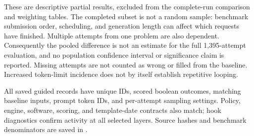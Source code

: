 These are descriptive partial results, excluded from the complete-run comparison and weighting tables. The completed subset is not a random sample: benchmark submission order, scheduling, and generation length can affect which requests have finished. Multiple attempts from one problem are also dependent. Consequently the pooled difference is not an estimate for the full 1,395-attempt evaluation, and no population confidence interval or significance claim is reported. Missing attempts are not counted as wrong or filled from the baseline. Increased token-limit incidence does not by itself establish repetitive looping.

All saved guided records have unique IDs, scored boolean outcomes, matching baseline inputs, prompt token IDs, and per-attempt sampling settings. Policy, engine, software, scoring, and template-date contracts also match; hook diagnostics confirm activity at all selected layers. Source hashes and benchmark denominators are saved in .
